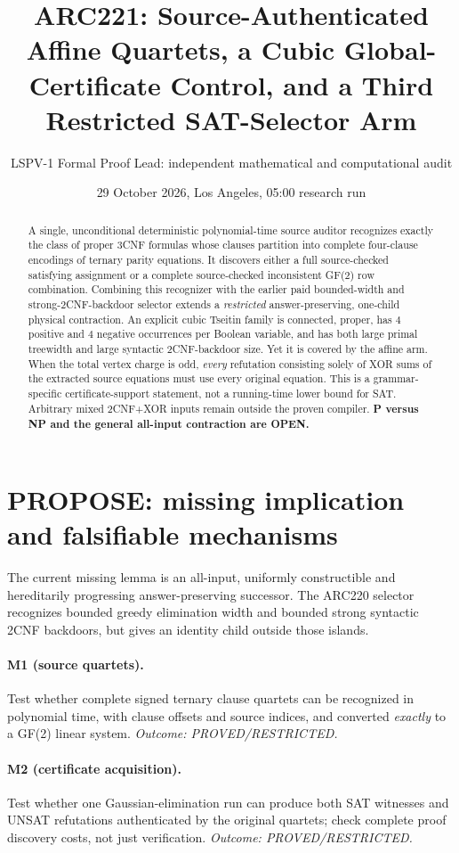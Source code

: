 \documentclass[11pt]{article}
\title{ARC221: Source-Authenticated Affine Quartets, a Cubic Global-Certificate Control, and a Third Restricted SAT-Selector Arm}
\author{LSPV-1 Formal Proof Lead: independent mathematical and computational audit}
\date{29 October 2026, Los Angeles, 05:00 research run}
\begin{document}
\sloppy
\maketitle
\begin{abstract}
A single, unconditional deterministic polynomial-time source auditor recognizes
exactly the class of proper 3CNF formulas whose clauses partition into complete
four-clause encodings of ternary parity equations.  It discovers either a full
source-checked satisfying assignment or a complete source-checked inconsistent
GF(2) row combination.  Combining this recognizer with the earlier paid
bounded-width and strong-2CNF-backdoor selector extends a \emph{restricted}
answer-preserving, one-child physical contraction.  An explicit cubic Tseitin
family is connected, proper, has $4$ positive and $4$ negative occurrences per
Boolean variable, and has both large primal treewidth and large syntactic
2CNF-backdoor size.  Yet it is covered by the affine arm.  When the total
vertex charge is odd, \emph{every} refutation consisting solely of XOR sums
of the extracted source equations must use every original equation.  This is
a grammar-specific certificate-support statement, not a running-time lower
bound for SAT.  Arbitrary mixed 2CNF+XOR inputs remain outside the proven
compiler.  \textbf{P versus NP and the general all-input contraction are OPEN.}
\end{abstract}

\section{PROPOSE: missing implication and falsifiable mechanisms}
The current missing lemma is an all-input, uniformly constructible and
hereditarily progressing answer-preserving successor.  The ARC220 selector
recognizes bounded greedy elimination width and bounded strong syntactic
2CNF backdoors, but gives an identity child outside those islands.

\paragraph{M1 (source quartets).} Test whether complete signed ternary
clause quartets can be recognized in polynomial time, with clause offsets and
source indices, and converted \emph{exactly} to a GF(2) linear system.
\emph{Outcome: PROVED/RESTRICTED.}
\paragraph{M2 (certificate acquisition).} Test whether one Gaussian-elimination
run can produce both SAT witnesses and UNSAT refutations authenticated by the
original quartets; check complete proof discovery costs, not just verification.
\emph{Outcome: PROVED/RESTRICTED.}
\end{document}

